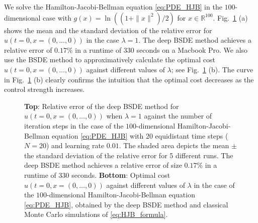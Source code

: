 \documentclass[11pt,english]{article}
\providecommand{\R}{{\ensuremath{\mathbb{R}}}}
\begin{document}
We solve the Hamilton-Jacobi-Bellman equation \eqref{eq:PDE_HJB} in the $100$-dimensional case with $g(x) = \ln\left((1 + \| x \|^2)/2\right)$ for $ x \in \R^{ 100 } $.
Fig.\ \ref{fig:HJB} (a) shows the mean and the standard deviation of the relative 
error for $ u(t{=}0,x{=}(0,\dots, 0))$ in the case $\lambda=1$.
The deep BSDE method achieves a relative error of $ 0.17\% $ in a runtime of $ 330 $ seconds
on a Macbook Pro.
We also use the BSDE method to approximatively calculate 
the optimal cost $u(t{=}0,x{=}(0,\dots,0))$ against different 
values of $ \lambda $; see Fig.\ \ref{fig:HJB} (b). 
The curve in Fig.\ \ref{fig:HJB} (b)
clearly confirms the intuition that the optimal cost decreases as 
the control strength increases. 

\begin{figure}[ht]
\centering
\setcounter{subfigure}{0}
\caption{\textbf{Top}: Relative error of the deep BSDE method for $ u( t{=}0, x{=}(0,\dots,0) )$ when $ \lambda = 1 $
against the number of iteration steps in the case of the $ 100 $-dimensional Hamilton-Jacobi-Bellman equation \eqref{eq:PDE_HJB} with $ 20 $ equidistant time steps ($ N{=}20 $) and learning rate $ 0.01 $.
The shaded area depicts the mean $\pm$ the standard deviation of the relative error for 5 different runs.
The deep BSDE method achieves a relative error of size $ 0.17\% $ in a runtime of $ 330 $ seconds. 
\textbf{Bottom}: Optimal cost $u(t{=}0,x{=}(0,\dots,0))$ against different values of $\lambda$ in the case of the $ 100 $-dimensional Hamilton-Jacobi-Bellman equation \eqref{eq:PDE_HJB}, obtained by the deep BSDE method and classical Monte Carlo simulations of \eqref{eq:HJB_formula}.
\label{fig:HJB}}
\end{figure}
\end{document}
